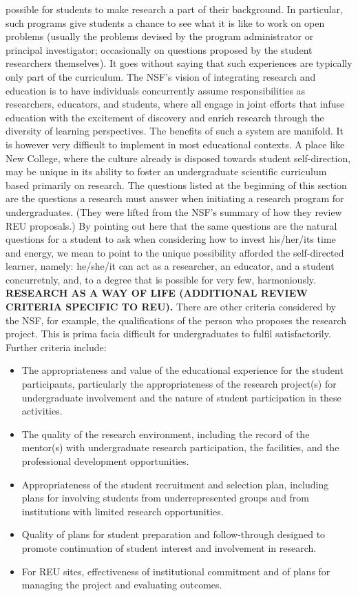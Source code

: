 possible for students to make research a part of their background.
In particular, such programs give students a chance to see what it
is like to work on open problems (usually the problems devised
by the program administrator or principal investigator; occasionally
on questions proposed by the student researchers themselves).  It
goes without saying that such experiences are typically only part
of the curriculum.  The NSF's vision of integrating research and
education is to have individuals concurrently assume responsibilities
as researchers, educators, and students, where all engage in joint
efforts that infuse education with the excitement of discovery and
enrich research through the diversity of learning perspectives.
The benefits of such a system are manifold.  It is however very
difficult to implement in most educational contexts.  A place
like New College, where the culture already is disposed towards
student self-direction, may be unique in its ability to foster
an undergraduate scientific curriculum based primarily on research.
The questions listed at the beginning of this section are the
questions a research must answer when initiating a research program
for undergraduates.  (They were lifted from the NSF's summary of how
they review REU proposals.)  By pointing out here that the same 
questions are the natural questions for a student to ask when
considering how to invest his/her/its time and energy, we mean
to point to the unique possibility afforded the self-directed
learner, namely: he/she/it can act as a researcher, an educator,
and a student concurretnly, and, to a degree that is possible for 
very few, harmoniously.\\

\noindent \textbf{RESEARCH AS A WAY OF LIFE (ADDITIONAL REVIEW CRITERIA SPECIFIC TO REU).}
There are other criteria considered by the NSF, for example, the
qualifications of the person who proposes the research project.
This is prima facia difficult for undergraduates to fulfil
satisfactorily.  Further criteria include:

\begin{itemize}
\item The appropriateness and value of the educational experience for the
  student participants, particularly the appropriateness of the
  research project(s) for undergraduate involvement and the nature of
  student participation in these activities.
\item The quality of the research environment, including the record of the
  mentor(s) with undergraduate research participation, the facilities,
  and the professional development opportunities.
\item Appropriateness of the student recruitment and selection plan,
  including plans for involving students from underrepresented groups
  and from institutions with limited research opportunities.
\item Quality of plans for student preparation and follow-through designed
  to promote continuation of student interest and involvement in
  research.
\item For REU sites, effectiveness of institutional commitment and of plans
  for managing the project and evaluating outcomes.
\end{itemize}

